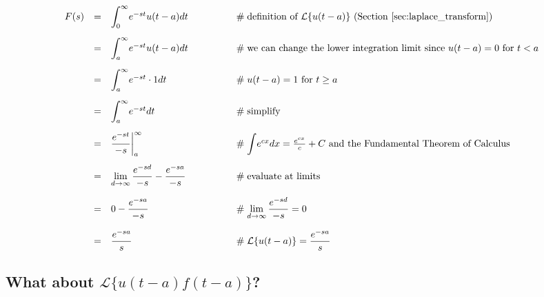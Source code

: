 \documentclass{article}
\theoremstyle{definition}
\begin{document}
\bigskip
\begin{equation*}
\begin{array}{lllll}
F(s)                                                                                                                          
&=& \mathlarger{\int}^\infty_0 e^{-st} u(t-a) dt                        &\qquad\qquad \mathrel{\#} \text{definition of $\mathcal{L}\{u(t-a)\}$ (Section \ref{sec:laplace_transform})}                                 \\
[15pt]
&=& \mathlarger{\int}^\infty_a e^{-st} u(t-a) dt                        &\qquad\qquad \mathrel{\#} \text{we can change the lower integration limit since $u(t-a) = 0$ for $t < a$}                                    \\
[15pt]
&=& \mathlarger{\int}^\infty_a e^{-st} \cdot 1 dt                      &\qquad\qquad \mathrel{\#} \text{$u(t-a) = 1$ for $t \geq a$}                                                                                                           \\
[15pt]
&=& \mathlarger{\int}^\infty_a e^{-st} dt                                  &\qquad\qquad \mathrel{\#} \text{simplify}                                                                                                                                        \\
[15pt]
&=& \mathlarger{\frac{e^{-st}}{-s}} \bigg |^\infty_a                   &\qquad\qquad \mathrel{\#} \mathlarger{\int} e^{cx} dx = \frac{e^{cx}}{c} + C \text{ and the Fundamental Theorem of Calculus}  \\
[15pt]
&=& \lim\limits_{d \to \infty} \mathlarger{\frac{e^{-sd}}{-s}} - \mathlarger{\frac{e^{-sa}}{-s}}   &\qquad\qquad \mathrel{\#} \text{evaluate at limits}                                                                          \\
[15pt]
&=& 0 -  \mathlarger{\frac{e^{-sa}}{-s}}                                   &\qquad\qquad \mathrel{\#} \lim\limits_{d \to \infty} \mathlarger{\frac{e^{-sd}}{-s}} = 0                                                                      \\
[15pt]
&=& \mathlarger{\frac{e^{-sa}}{s}}                                          &\qquad\qquad \mathrel{\#} \mathcal{L}\{u(t-a)\} = \mathlarger{\frac{e^{-sa}}{s}}
\end{array}
\end{equation*}


\subsection{What about $\mathcal{L}\{u(t-a) f(t-a)\}$?}
\label{sec:lt_uf}
\end{document}
